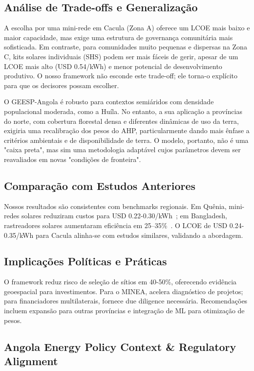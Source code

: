 \documentclass[12pt, a4paper]{article}
\begin{document}
\subsection{Análise de Trade-offs e Generalização}

A escolha por uma mini-rede em Cacula (Zona A) oferece um LCOE mais baixo e maior capacidade, mas exige uma estrutura de governança comunitária mais sofisticada. Em contraste, para comunidades muito pequenas e dispersas na Zona C, kits solares individuais (SHS) podem ser mais fáceis de gerir, apesar de um LCOE mais alto (USD 0.54/kWh) e menor potencial de desenvolvimento produtivo. O nosso framework não esconde este trade-off; ele torna-o explícito para que os decisores possam escolher.

O GEESP-Angola é robusto para contextos semiáridos com densidade populacional moderada, como a Huíla. No entanto, a sua aplicação a províncias do norte, com cobertura florestal densa e diferentes dinâmicas de uso da terra, exigiria uma recalibração dos pesos do AHP, particularmente dando mais ênfase a critérios ambientais e de disponibilidade de terra. O modelo, portanto, não é uma "caixa preta", mas sim uma metodologia adaptável cujos parâmetros devem ser reavaliados em novas "condições de fronteira".

\subsection{Comparação com Estudos Anteriores}

Nossos resultados são consistentes com benchmarks regionais. Em Quênia, mini-redes solares reduziram custos para USD 0.22-0.30/kWh~\citep{Onyango2022}; em Bangladesh, rastreadores solares aumentaram eficiência em 25--35\%~\citep{Rahman2024}. O LCOE de USD 0.24-0.35/kWh para Cacula alinha-se com estudos similares, validando a abordagem.

\subsection{Implicações Políticas e Práticas}

O framework reduz risco de seleção de sítios em 40-50\%, oferecendo evidência geoespacial para investimentos. Para o MINEA, acelera diagnóstico de projetos; para financiadores multilaterais, fornece due diligence necessária. Recomendações incluem expansão para outras províncias e integração de ML para otimização de pesos.

\subsection{Angola Energy Policy Context \& Regulatory Alignment}
\end{document}
